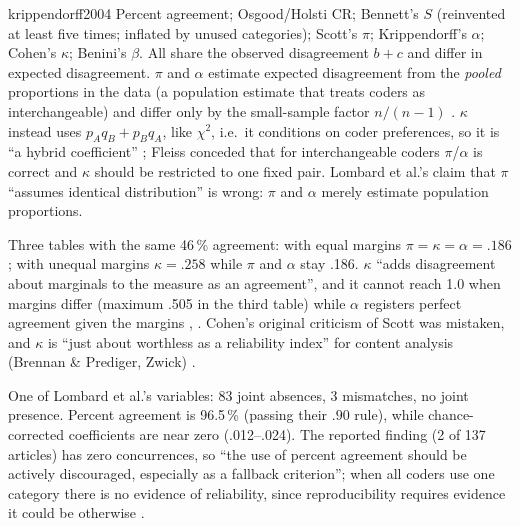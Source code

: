 \begin{papercard}{krippendorff2004}
 Percent agreement; Osgood/Holsti CR; Bennett's $S$ (reinvented at least five times; inflated by unused categories); Scott's $\pi$; Krippendorff's $\alpha$; Cohen's $\kappa$; Benini's $\beta$. All share the observed disagreement $b+c$ and differ in expected disagreement. $\pi$ and $\alpha$ estimate expected disagreement from the \emph{pooled} proportions in the data (a population estimate that treats coders as interchangeable) and differ only by the small-sample factor $n/(n-1)$ . $\kappa$ instead uses $p_Aq_B+p_Bq_A$, like $\chi^2$, i.e.\ it conditions on coder preferences, so it is ``a hybrid coefficient'' ; Fleiss conceded that for interchangeable coders $\pi$/$\alpha$ is correct and $\kappa$ should be restricted to one fixed pair. Lombard et al.'s claim that $\pi$ ``assumes identical distribution'' is wrong: $\pi$ and $\alpha$ merely estimate population proportions.

 Three tables with the same 46\,\% agreement: with equal margins $\pi=\kappa=\alpha=.186$; with unequal margins $\kappa=.258$ while $\pi$ and $\alpha$ stay .186. $\kappa$ ``adds disagreement about marginals to the measure as an agreement'', and it cannot reach 1.0 when margins differ (maximum .505 in the third table) while $\alpha$ registers perfect agreement given the margins , . Cohen's original criticism of Scott was mistaken, and $\kappa$ is ``just about worthless as a reliability index'' for content analysis (Brennan \& Prediger, Zwick) .

 One of Lombard et al.'s variables: 83 joint absences, 3 mismatches, no joint presence. Percent agreement is 96.5\,\% (passing their $.90$ rule), while chance-corrected coefficients are near zero (.012--.024). The reported finding (2 of 137 articles) has zero concurrences, so ``the use of percent agreement should be actively discouraged, especially as a fallback criterion''; when all coders use one category there is no evidence of reliability, since reproducibility requires evidence it could be otherwise .


\end{papercard}
